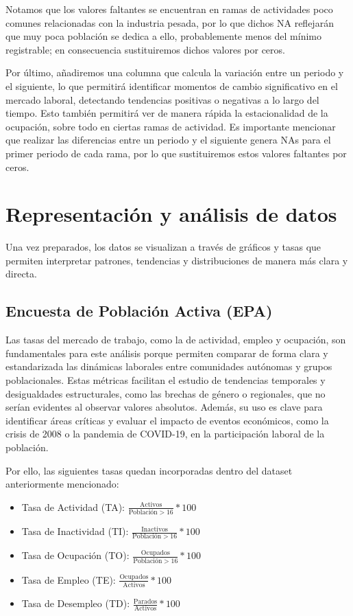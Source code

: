 \documentclass[Universitat de
València,article,submit,moreauthors,pdftex]{Definitions/mdpi}
\begin{document}
Notamos que los valores faltantes se encuentran en ramas de actividades
poco comunes relacionadas con la industria pesada, por lo que dichos NA
reflejarán que muy poca población se dedica a ello, probablemente menos
del mínimo registrable; en consecuencia sustituiremos dichos valores por
ceros.

Por último, añadiremos una columna que calcula la variación entre un
periodo y el siguiente, lo que permitirá identificar momentos de cambio
significativo en el mercado laboral, detectando tendencias positivas o
negativas a lo largo del tiempo. Esto también permitirá ver de manera
rápida la estacionalidad de la ocupación, sobre todo en ciertas ramas de
actividad. Es importante mencionar que realizar las diferencias entre un
periodo y el siguiente genera NAs para el primer periodo de cada rama,
por lo que sustituiremos estos valores faltantes por ceros.

\section{Representación y análisis de
datos}\label{representaciuxf3n-y-anuxe1lisis-de-datos}

Una vez preparados, los datos se visualizan a través de gráficos y tasas
que permiten interpretar patrones, tendencias y distribuciones de manera
más clara y directa.

\subsection{Encuesta de Población Activa
(EPA)}\label{encuesta-de-poblaciuxf3n-activa-epa-1}

Las tasas del mercado de trabajo, como la de actividad, empleo y
ocupación, son fundamentales para este análisis porque permiten comparar
de forma clara y estandarizada las dinámicas laborales entre comunidades
autónomas y grupos poblacionales. Estas métricas facilitan el estudio de
tendencias temporales y desigualdades estructurales, como las brechas de
género o regionales, que no serían evidentes al observar valores
absolutos. Además, su uso es clave para identificar áreas críticas y
evaluar el impacto de eventos económicos, como la crisis de 2008 o la
pandemia de COVID-19, en la participación laboral de la población.

Por ello, las siguientes tasas quedan incorporadas dentro del dataset
anteriormente mencionado:

\begin{itemize}
\item
  Tasa de Actividad (TA):
  \(\frac{\text{Activos}}{\text{Población} > 16}*100\)
\item
  Tasa de Inactividad (TI):
  \(\frac{\text{Inactivos}}{\text{Población} > 16}*100\)
\item
  Tasa de Ocupación (TO):
  \(\frac{\text{Ocupados}}{\text{Población} > 16}*100\)
\item
  Tasa de Empleo (TE): \(\frac{\text{Ocupados}}{\text{Activos}}*100\)
\item
  Tasa de Desempleo (TD): \(\frac{\text{Parados}}{\text{Activos}}*100\)
\end{itemize}
\end{document}

